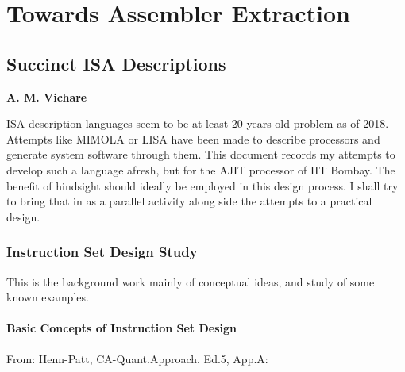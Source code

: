 \chapter{Towards Assembler Extraction}
\label{chap:asm:extraction}

\section{Succinct ISA Descriptions}
\label{sec:sisad}

\textbf{A. M. Vichare}

ISA description languages seem to be  at least 20 years old problem as
of 2018.   Attempts like  MIMOLA or  LISA have  been made  to describe
processors and  generate system software through  them.  This document
records my  attempts to develop  such a  language afresh, but  for the
AJIT processor of IIT Bombay.  The benefit of hindsight should ideally
be employed in this design process.  I shall try to bring that in as a
parallel activity along side the attempts to a practical design.

\subsection{Instruction Set Design Study}
\label{sec:isa:design:study}

This is the  background work mainly of conceptual ideas,  and study of
some known examples.

\subsubsection{Basic Concepts of Instruction Set Design}
\label{sec:basic:isa:design:info}

From: Henn-Patt, CA-Quant.Approach. Ed.5, App.A:

